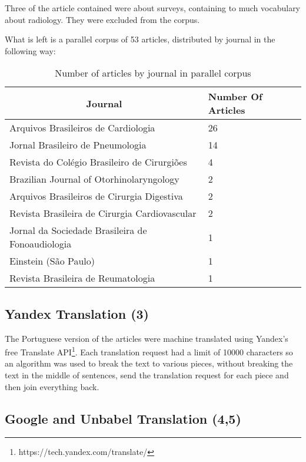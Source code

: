 Three of the article contained were about surveys, containing to much vocabulary about radiology. They were excluded from the corpus.

What is left is a parallel corpus of 53 articles, distributed by journal in the following way:

\begin{table}[h]
\centering
\caption{Number of articles by journal in parallel corpus}
\label{table:articles_by_journal}
\begin{tabular}{@{}ll@{}}
\toprule
\multicolumn{1}{c}{\textbf{Journal}}                 & \textbf{Number Of Articles} \\ \midrule
Arquivos Brasileiros de Cardiologia         & 26                          \\
Jornal Brasileiro de Pneumologia            & 14                          \\
Revista do Colégio Brasileiro de Cirurgiões & 4                           \\
Brazilian Journal of Otorhinolaryngology    & 2                           \\
Arquivos Brasileiros de Cirurgia Digestiva  & 2                           \\
Revista Brasileira de Cirurgia Cardiovascular        & 2                           \\
Jornal da Sociedade Brasileira de Fonoaudiologia     & 1                           \\
Einstein (São Paulo)                                 & 1                           \\
Revista Brasileira de Reumatologia                   & 1                           \\ \bottomrule
\end{tabular}
\end{table}

\subsection{Yandex Translation (3)}

The Portuguese version of the articles were machine translated using Yandex's free Translate API\footnote{https://tech.yandex.com/translate/}. Each translation request had a limit of 10000 characters so an algorithm was used to break the text to various pieces, without breaking the text in the middle of sentences, send the translation request for each piece and then join everything back.

\subsection{Google and Unbabel Translation (4,5)}

